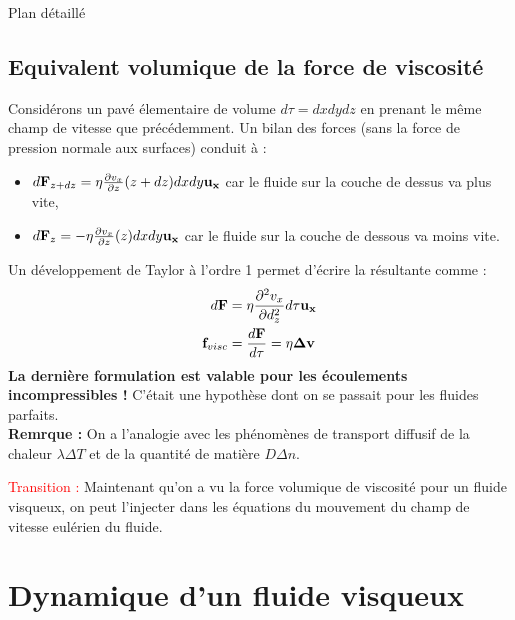\begin{reportBlock}{Plan détaillé}
  \subsection{Equivalent volumique de la force de viscosité}
Considérons un pavé élementaire de volume $d\tau=dxdydz$ en prenant le même champ de vitesse que précédemment. Un bilan des forces (sans la force de pression normale aux surfaces) conduit à :
\begin{itemize}
    \item $d\mathbf{F}_{z+dz}=\eta\frac{\partial v_x}{\partial z}(z+dz)dxdy\mathbf{u_x}$ car le fluide sur la couche de dessus va plus vite,
    \item  $d\mathbf{F}_{z}=-\eta\frac{\partial v_x}{\partial z}(z)dxdy
    \mathbf{u_x}$ car le fluide sur la couche de dessous va moins vite.
\end{itemize}
Un développement de Taylor à l'ordre 1 permet d'écrire la résultante comme :
\begin{align}
    d\mathbf{F} &= \eta\frac{\partial ^2v_x}{\partial d_z^2}d\tau\mathbf{u_x} \\
    \mathbf{f}_{visc}&=\frac{d\mathbf{F}}{d\tau} = \eta\mathbf{\Delta v}
\end{align}
\textbf{La dernière formulation est valable pour les écoulements incompressibles !} C'était une hypothèse dont on se passait pour les fluides parfaits.\\
\textbf{Remrque :} On a l'analogie avec les phénomènes de transport diffusif de la chaleur $\lambda\Delta T$ et de la quantité de matière $D\Delta n$. 


  
  \textcolor{red}{Transition :} Maintenant qu'on a vu la force volumique de viscosité pour un fluide visqueux, on peut l'injecter dans les équations du mouvement du champ de vitesse eulérien du fluide.

  \section{Dynamique d'un fluide visqueux}


\end{reportBlock}
